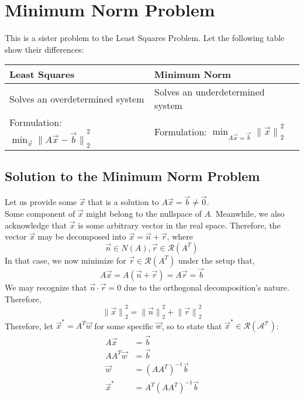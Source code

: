 \section{Minimum Norm Problem}
This is a sister problem to the Least Squares Problem. Let the following table show their differences:
\begin{center}
    \begin{tabular}{l | l}
        Least Squares & Minimum Norm \\
        \hline
        \hline
        Solves an overdetermined system & Solves an underdetermined system \\
        \hline
        Formulation: $\min_{\vec{x}} {\lVert A\vec{x} - \vec{b} \rVert}_2^2$ & Formulation: $\min_{A\vec{x} = \vec{b}} {\lVert \vec{x} \rVert}_2^2$
    \end{tabular}
\end{center}

\subsection{Solution to the Minimum Norm Problem}
Let us provide some $\vec{x}$ that is a solution to $A \vec{x} = \vec{b} \neq \vec{0}$. \\
Some component of $\vec{x}$ might belong to the nullspace of $A$. Meanwhile, we also acknowledge that $\vec{x}$ is some arbitrary vector in the real space.
Therefore, the vector $\vec{x}$ may be decomposed into $\vec{x} = \vec{n} + \vec{r}$, where 
\[
    \vec{n} \in N(A), \vec{r} \in \mathcal{R}(A^T)
\]
In that case, we now minimize for $\vec{r} \in \mathcal{R}(A^T)$ under the setup that,
\[
    A \vec{x} = A(\vec{n} + \vec{r}) = A \vec{r} = \vec{b}
\]
We may recognize that $\vec{n} \cdot \vec{r} = 0$ due to the orthogonal decomposition's nature. Therefore,
\[
    {\lVert \vec{x} \rVert}_2^2 = {\lVert \vec{n} \rVert}_2^2 + {\lVert \vec{r} \rVert}_2^2
\]
Therefore, let $\vec{x}^* = A^T \vec{w}$ for some specific $\vec{w}$, so to state that $\vec{x}^* \in \mathcal{R(A^T)}$:
\begin{align*}
    A \vec{x} &= \vec{b} \\
    A A^T \vec{w} &= \vec{b} \\
    \vec{w} &= {(A A^T)}^{-1} \vec{b} \\
    \vec{x}^* &= A^T {(A A^T)}^{-1} \vec{b}
\end{align*}

